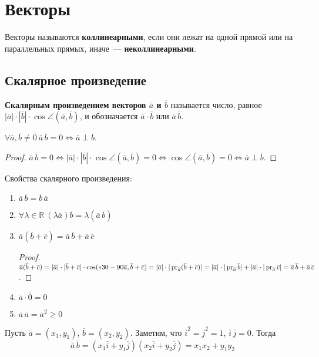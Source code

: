 \section{Векторы}
 Векторы называются \textbf{коллинеарными}, если они лежат на одной прямой или на параллельных прямых, иначе~--- \textbf{неколлинеарными}.

\subsection{Скалярное произведение}
 \textbf{Скалярным произведением векторов $\overline a$ и $\overline b$} называется число, равное $|\overline a| \cdot |\overline b| \cdot \cos \angle(\overline a, \overline b)$, и обозначается $\overline a \cdot \overline b$ или $\overline a\,\overline b$.

\begin{statement}
$\forall \overline a, \overline b \neq \overline 0 \ \overline a\,\overline b = 0 \Leftrightarrow \overline a \perp \overline b$.
\end{statement}
\begin{proof}
$\overline a\,\overline b = 0 \Leftrightarrow
|\overline a| \cdot |\overline b| \cdot \cos \angle(\overline a, \overline b) = 0 \Leftrightarrow
\cos \angle(\overline a, \overline b) = 0 \Leftrightarrow
\overline a \perp \overline b$.
\end{proof}

Свойства скалярного произведения:
\begin{enumerate}
	\item $\overline a\,\overline b = \overline b\,\overline a$
	\item $\forall \lambda \in \mathbb R \ (\lambda \overline a) \overline b = \lambda (\overline a\,\overline b)$
	\item $\overline a (\overline b + \overline c) = \overline a\,\overline b + \overline a\,\overline c$
	\begin{proof}
	$\overline a (\overline b + \overline c) = 
	|\overline a| \cdot |\overline b + \overline c| \cdot \cos (*30-90\overline a, \overline b + \overline c) =
	|\overline a| \cdot |\operatorname{pr}_{\overline a} (\overline b + \overline c)| =
	|\overline a| \cdot |\operatorname{pr}_{\overline a} \overline b| + |\overline a| \cdot |\operatorname{pr}_{\overline a} \overline c| =
	\overline a\,\overline b + \overline a\,\overline c$.
	\end{proof}
	\item $\overline a \cdot \overline 0 = 0$
	\item $\overline a\,\overline a = \overline a^2 \geqslant 0$
\end{enumerate}

Пусть $\overline a = (x_1, y_1)$, $\overline b = (x_2, y_2)$.
Заметим, что $\overline i^2 = \overline j^2 = 1$, $\overline i\,\overline j = 0$.
Тогда
\begin{equation*}
\overline a\,\overline b =
(x_1 \overline i + y_1 \overline j) (x_2 \overline i + y_2 \overline j) =
x_1 x_2 + y_1 y_2
\end{equation*}